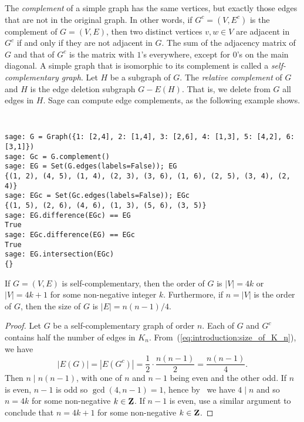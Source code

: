 The \emph{complement} of a simple graph has the same vertices, but
exactly those edges that are not in the original graph. In other
words, if $G^c = (V, E^c)$ is the complement of $G = (V,E)$, then two
distinct vertices $v,w \in V$ are adjacent in $G^c$ if and only if
they are not adjacent in $G$. The sum of the adjacency matrix of $G$
and that of $G^c$ is the matrix with $1$'s everywhere, except for
$0$'s on the main diagonal. A simple graph that is isomorphic to its
complement is called a \emph{self-complementary graph}. Let $H$ be a
subgraph of $G$. The \emph{relative complement} of $G$ and $H$ is the
edge deletion subgraph $G - E(H)$. That is, we delete from $G$ all
edges in $H$. Sage can compute edge complements, as the following
example shows.
%
\begin{center}
\fontsize{9pt}{9pt}
\selectfont
\tt
\begin{lstlisting}
sage: G = Graph({1: [2,4], 2: [1,4], 3: [2,6], 4: [1,3], 5: [4,2], 6: [3,1]})
sage: Gc = G.complement()
sage: EG = Set(G.edges(labels=False)); EG
{(1, 2), (4, 5), (1, 4), (2, 3), (3, 6), (1, 6), (2, 5), (3, 4), (2, 4)}
sage: EGc = Set(Gc.edges(labels=False)); EGc
{(1, 5), (2, 6), (4, 6), (1, 3), (5, 6), (3, 5)}
sage: EG.difference(EGc) == EG
True
sage: EGc.difference(EG) == EGc
True
sage: EG.intersection(EGc)
{}
\end{lstlisting}
\end{center}

\begin{theorem}
If $G = (V, E)$ is self-complementary, then the order of $G$ is
$|V| = 4k$ or $|V| = 4k + 1$ for some non-negative integer
$k$. Furthermore, if $n = |V|$ is the order of $G$, then the size of
$G$ is $|E| = n(n - 1) / 4$.
\end{theorem}

\begin{proof}
Let $G$ be a self-complementary graph of order $n$. Each of $G$ and
$G^c$ contains half the number of edges in
$K_n$. From~(\ref{eq:introduction:size_of_K_n}), we have
\[
|E(G)|
=
|E(G^c)|
=
\frac{1}{2} \cdot \frac{n(n - 1)}{2}
=
\frac{n(n - 1)}{4}.
\]
Then $n \;|\; n(n - 1)$, with one of $n$ and $n - 1$ being even and
the other odd. If $n$ is even, $n - 1$ is odd so $\gcd(4, n-1) = 1$,
hence by~\cite[Theorem~1.9]{Shoup2008} we have $4 \;|\; n$ and so
$n = 4k$ for some non-negative $k \in \mathbf{Z}$. If $n - 1$ is even, use a
similar argument to conclude that $n = 4k + 1$ for some non-negative
$k \in \mathbf{Z}$.
\end{proof}


